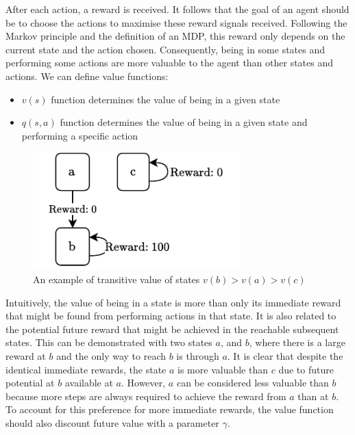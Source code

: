 \documentclass[]{final_report}
\begin{document}
After each action, a reward is received. It follows that the goal of an agent should be to choose the actions to maximise these reward signals received. Following the Markov principle and the definition of an MDP, this reward only depends on the current state and the action chosen. Consequently, being in some states and performing some actions are more valuable to the agent than other states and actions. We can define value functions: 
\begin{itemize}
  \item $v(s)$ function determines the value of being in a given state
  \item $q(s, a)$ function determines the value of being in a given state and performing a specific action
\end{itemize}



\begin{figure}[H]
  \centering
  
  \includegraphics[width=8cm]{reward-example-2}
  
  \caption{\label{fig:reward-example} An example of transitive value of states $v(b) > v(a) > v(c)$}
\end{figure}

Intuitively, the value of being in a state is more than only its immediate reward that might be found from performing actions in that state. It is also related to the potential future reward that might be achieved in the reachable subsequent states. This can be demonstrated with two states $a$, and $b$, where there is a large reward at $b$ and the only way to reach $b$ is through $a$. It is clear that despite the identical immediate rewards, the state $a$ is more valuable than $c$ due to future potential at $b$ available at $a$. However, $a$ can be considered less valuable than $b$ because more steps are always required to achieve the reward from $a$ than at $b$. To account for this preference for more immediate rewards, the value function should also discount future value with a parameter $\gamma$. 
\end{document}
